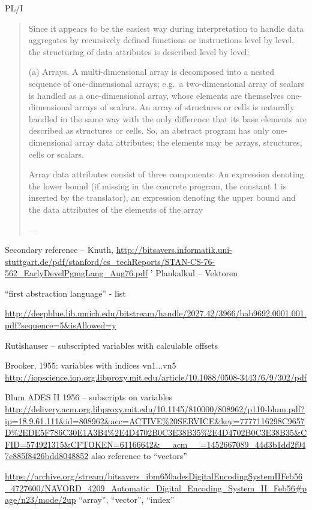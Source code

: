 PL/I
\begin{quote}
Since it appears to be the
easiest way during interpretation to handle data aggregates by recursively defined
functions or instructions level by level, the structuring of data attributes is
described level by level:

(a)
Arrays. A multi-dimensional array is decomposed into a nested sequence of
one-dimensional arrays; e.g.\ a two-dimensional array of scalars is handled
as a one-dimensional array, whose elements are themselves one-dimensional
arrays of scalars. An array of structures or cells is naturally handled in
the same way with the only difference that its base elements are described
as structures or cells. So, an abstract program has only one-dimensional
array data attributes; the elements may be arrays, structures, cells or
scalars.

Array data attributes consist of three components: An expression denoting
the lower bound (if missing in the concrete program, the constant 1 is inserted
by the translator), an expression denoting the upper bound and the
data attributes of the elements of the array

--- \cite[\S 2.3.1, pp. 2-8--9]{Lucas1968}
\end{quote}

Secondary reference – Knuth,
\url{http://bitsavers.informatik.uni-stuttgart.de/pdf/stanford/cs_techReports/STAN-CS-76-562_EarlyDevelPgmgLang_Aug76.pdf}
'
Plankalkul – Vektoren


``first abstraction language'' - list

\url{http://deepblue.lib.umich.edu/bitstream/handle/2027.42/3966/bab9692.0001.001.pdf?sequence=5&isAllowed=y}

Rutishauser – subscripted variables with calculable offsets

Brooker, 1955: variables with indices vn1...vn5
\url{http://iopscience.iop.org.libproxy.mit.edu/article/10.1088/0508-3443/6/9/302/pdf}

Blum ADES II 1956 – subscripts on variables
\url{http://delivery.acm.org.libproxy.mit.edu/10.1145/810000/808962/p110-blum.pdf?ip=18.9.61.111&id=808962&acc=ACTIVE%20SERVICE&key=7777116298C9657D%2EDE5F786C30E1A3B4%2E4D4702B0C3E38B35%2E4D4702B0C3E38B35&CFID=574921315&CFTOKEN=61166642&__acm__=1452667089_44d3b1dd2f947c885f8426bdd8048852}
also reference to “vectors”

\url{https://archive.org/stream/bitsavers_ibm650adesDigitalEncodingSystemIIFeb56_4727600/NAVORD_4209_Automatic_Digital_Encoding_System_II_Feb56#page/n23/mode/2up}
“array”, “vector”, “index”

